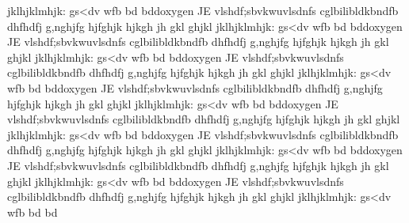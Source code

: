 jklhjklmhjk:
gs<dv
wfb
bd
bddoxygen
JE vlshdf;sbvkwuvlsdnfs
cglbilibldkbndfb
dhfhdfj
g,nghjfg
hjfghjk
hjkgh
jh
gkl
ghjkl
jklhjklmhjk:
gs<dv
wfb
bd
bddoxygen
JE vlshdf;sbvkwuvlsdnfs
cglbilibldkbndfb
dhfhdfj
g,nghjfg
hjfghjk
hjkgh
jh
gkl
ghjkl
jklhjklmhjk:
gs<dv
wfb
bd
bddoxygen
JE vlshdf;sbvkwuvlsdnfs
cglbilibldkbndfb
dhfhdfj
g,nghjfg
hjfghjk
hjkgh
jh
gkl
ghjkl
jklhjklmhjk:
gs<dv
wfb
bd
bddoxygen
JE vlshdf;sbvkwuvlsdnfs
cglbilibldkbndfb
dhfhdfj
g,nghjfg
hjfghjk
hjkgh
jh
gkl
ghjkl
jklhjklmhjk:
gs<dv
wfb
bd
bddoxygen
JE vlshdf;sbvkwuvlsdnfs
cglbilibldkbndfb
dhfhdfj
g,nghjfg
hjfghjk
hjkgh
jh
gkl
ghjkl
jklhjklmhjk:
gs<dv
wfb
bd
bddoxygen
JE vlshdf;sbvkwuvlsdnfs
cglbilibldkbndfb
dhfhdfj
g,nghjfg
hjfghjk
hjkgh
jh
gkl
ghjkl
jklhjklmhjk:
gs<dv
wfb
bd
bddoxygen
JE vlshdf;sbvkwuvlsdnfs
cglbilibldkbndfb
dhfhdfj
g,nghjfg
hjfghjk
hjkgh
jh
gkl
ghjkl
jklhjklmhjk:
gs<dv
wfb
bd
bddoxygen
JE vlshdf;sbvkwuvlsdnfs
cglbilibldkbndfb
dhfhdfj
g,nghjfg
hjfghjk
hjkgh
jh
gkl
ghjkl
jklhjklmhjk:
gs<dv
wfb
bd
bd
